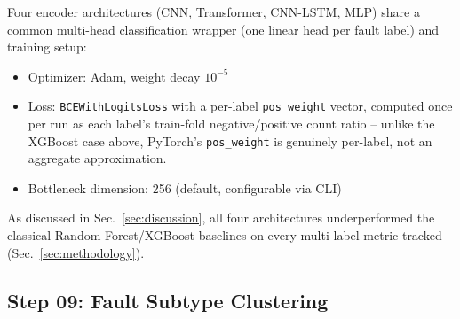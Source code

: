 Four encoder architectures (CNN, Transformer, CNN-LSTM, MLP) share a common multi-head classification wrapper (one linear head per fault label) and training setup:
\begin{itemize}
    \item Optimizer: Adam, weight decay $10^{-5}$  %
    \item Loss: \texttt{BCEWithLogitsLoss} with a per-label \texttt{pos\_weight} vector, computed once per run as each label's train-fold negative/positive count ratio -- unlike the XGBoost case above, PyTorch's \texttt{pos\_weight} is genuinely per-label, not an aggregate approximation.
    \item Bottleneck dimension: 256 (default, configurable via CLI)  %
\end{itemize}
As discussed in Sec.~\ref{sec:discussion}, all four architectures underperformed the classical Random Forest/XGBoost baselines on every multi-label metric tracked (Sec.~\ref{sec:methodology}).

\subsection{Step 09: Fault Subtype Clustering}  %

